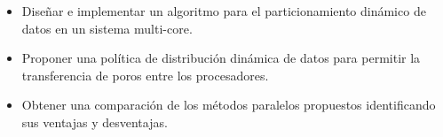 \begin{itemize}


\item {Diseñar e implementar un algoritmo para el particionamiento din\'amico de datos en un sistema multi-core}.

\item {Proponer una pol\'itica de distribuci\'on din\'amica de datos para permitir la transferencia de poros entre los procesadores}. 

\item {Obtener una comparaci\'on de los m\'etodos paralelos propuestos identificando sus ventajas y desventajas}. 
\end{itemize}






